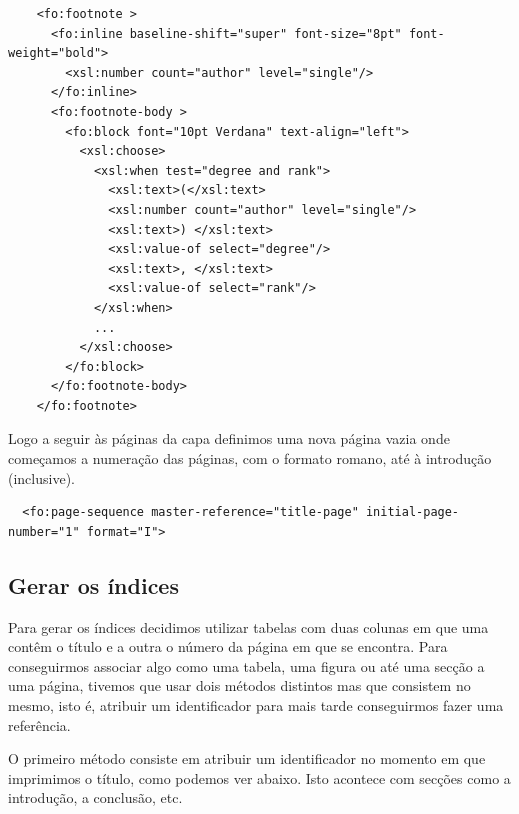 \documentclass[a4paper]{article}
\begin{document}
\begin{small}
\begin{lstlisting}
    <fo:footnote >
      <fo:inline baseline-shift="super" font-size="8pt" font-weight="bold">
        <xsl:number count="author" level="single"/>
      </fo:inline>
      <fo:footnote-body >
        <fo:block font="10pt Verdana" text-align="left">
          <xsl:choose>
            <xsl:when test="degree and rank">
              <xsl:text>(</xsl:text>
              <xsl:number count="author" level="single"/>
              <xsl:text>) </xsl:text>
              <xsl:value-of select="degree"/>
              <xsl:text>, </xsl:text>
              <xsl:value-of select="rank"/>
            </xsl:when>
            ...
          </xsl:choose>
        </fo:block>
      </fo:footnote-body>
    </fo:footnote>
\end{lstlisting}
\end{small}

\hspace{1cm}Logo a seguir às páginas da capa definimos uma nova página vazia onde começamos a numeração das páginas, com o formato romano, até à introdução (inclusive).\\

\begin{small}
\begin{lstlisting}
  <fo:page-sequence master-reference="title-page" initial-page-number="1" format="I">
\end{lstlisting}
\end{small}

\vspace{1cm}
\subsection{\large Gerar os índices}

\hspace{1cm}Para gerar os índices decidimos utilizar tabelas com duas colunas em que uma contêm o título e a outra o número da página em que se encontra. Para conseguirmos associar algo como uma tabela, uma figura ou até uma secção a uma página, tivemos que usar dois métodos distintos mas que consistem no mesmo, isto é, atribuir um identificador para mais tarde conseguirmos fazer uma referência.

\hspace{1cm}O primeiro método consiste em atribuir um identificador no momento em que imprimimos o título, como podemos ver abaixo. Isto acontece com secções como a introdução, a conclusão, etc.\\
  
\end{document}
